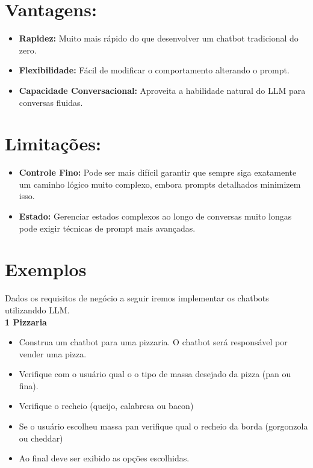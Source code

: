 \documentclass[14pt,a4paper,oneside]{book}
\begin{document}
\section*{Vantagens:}

\begin{itemize}
    \item \textbf{Rapidez:} Muito mais rápido do que desenvolver um chatbot tradicional do zero.
    \item \textbf{Flexibilidade:} Fácil de modificar o comportamento alterando o prompt.
    \item \textbf{Capacidade Conversacional:} Aproveita a habilidade natural do LLM para conversas fluidas.
\end{itemize}

\section*{Limitações:}

\begin{itemize}
    \item \textbf{Controle Fino:} Pode ser mais difícil garantir que sempre siga exatamente um caminho lógico muito complexo, embora prompts detalhados minimizem isso.
    \item \textbf{Estado:} Gerenciar estados complexos ao longo de conversas muito longas pode exigir técnicas de prompt mais avançadas.
\end{itemize}

\section*{Exemplos}

Dados os requisitos de negócio a seguir iremos implementar os chatbots utilizanddo LLM. \\

\textbf{1 Pizzaria} \\

\begin{itemize}[nosep]
	\item Construa um chatbot para uma pizzaria. O chatbot será responsável por vender uma pizza.
	\item Verifique com o usuário qual o o tipo de massa desejado da pizza (pan ou fina).
	\item Verifique o recheio (queijo, calabresa ou bacon)
	\item Se o usuário escolheu massa pan verifique qual o recheio da borda (gorgonzola ou cheddar)
	\item Ao final deve ser exibido as opções escolhidas.
\end{itemize} 
\end{document}
